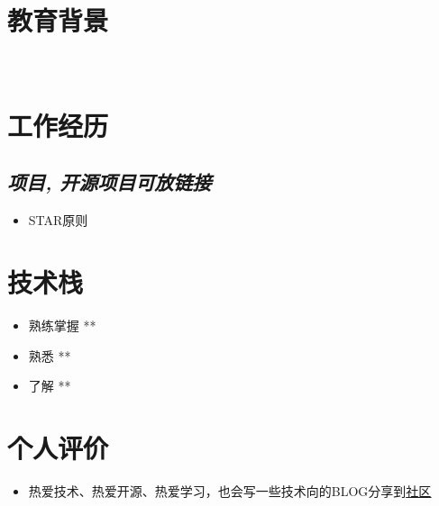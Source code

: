 \documentclass{resume}
\begin{document}



\section{教育背景}
\

\section{工作经历}
\subsection{\textit{项目, 开源项目可放链接}}
\begin{itemize}
  \item STAR原则
\end{itemize}

\section{技术栈}
\begin{itemize}
  \item 熟练掌握 **
  \item 熟悉 **
  \item 了解 **
\end{itemize}

\section{个人评价}
\begin{itemize}
  \item 热爱技术、热爱开源、热爱学习，也会写一些技术向的BLOG分享到\href {https://segmentfault.com/blog/xfslove}{\underline {社区}}
\end{itemize}
\end{document}

